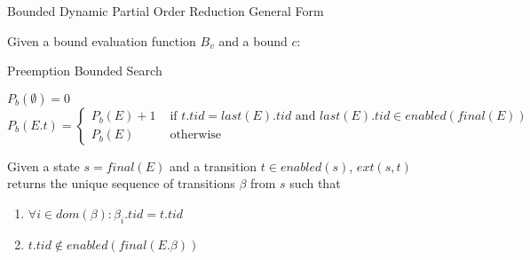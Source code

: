 \documentclass[9pt]{beamer}
\begin{document}
\begin{frame}{Bounded Dynamic Partial Order Reduction General Form}

Given a bound evaluation function $B_v$ and a bound $c$:

\begin{figure}
\end{figure}
    
\end{frame}

\begin{frame}{Preemption Bounded Search}

\begin{definition}
$P_b(\emptyset) = 0$ \\
$P_b(E.t) = 
 \begin{cases} 
    P_b(E) + 1 & \text{ if } t.tid = last(E).tid \text{ and } last(E).tid \in enabled(final(E)) \\
    P_b(E) & \text{ otherwise }
 \end{cases}
$
\end{definition}
    
\end{frame}

\begin{frame}

\begin{definition}[$ext(s,t)$]
    Given a state $s = final(E)$ and a transition $t \in enabled(s)$,
    $ext(s,t)$ returns the unique sequence of transitions $\beta$ from $s$
    such that
    \begin{enumerate}
        \item $\forall i \in dom(\beta): \beta_i.tid = t.tid$
        \item $t.tid \notin enabled(final(E.\beta))$
    \end{enumerate}
\end{definition}
    
\end{frame}
\end{document}
